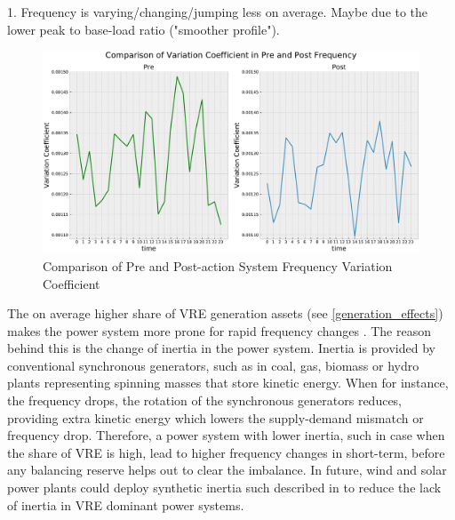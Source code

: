 \documentclass[energies,article,submit,moreauthors,pdftex]{Definitions/mdpi}
\begin{document}
1. Frequency is varying/changing/jumping less on average. Maybe due to the lower peak to base-load ratio ("smoother profile").

\begin{figure}[H]
\centering
\hspace{-25pt}\includegraphics[width=16.5 cm]{Graphics/FFreq_VarCoeff_comp_2.pdf}
\caption{Comparison of Pre and Post-action System Frequency Variation Coefficient} \label{fig:freq_hist}
\end{figure}  

The on average higher share of VRE generation assets (see \ref{generation_effects}) makes the power system more prone for rapid frequency changes \cite{Ela2011OperatingReserves.}. The reason behind this is the change of inertia in the power system. Inertia is provided by conventional synchronous generators, such as in coal, gas, biomass or hydro plants representing spinning masses that store kinetic energy. When for instance, the frequency drops, the rotation of the synchronous generators reduces, providing extra kinetic energy which lowers the supply-demand mismatch or frequency drop. Therefore, a power system with lower inertia, such in case when the share of VRE is high, lead to higher frequency changes in short-term, before any balancing reserve helps out to clear the imbalance. In future, wind and solar power plants could deploy synthetic inertia such described in \cite{Hansen2014AnalysisTurbines, Zeni2013VirtualTurbines, Liu2017PV-basedSystem} to reduce the lack of inertia in VRE dominant power systems.



\end{document}
